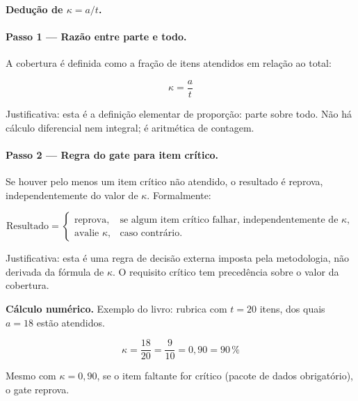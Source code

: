 \begin{metodo}
\textbf{Dedução de $\kappa = a/t$.}

\paragraph{Passo 1 — Razão entre parte e todo.}
A cobertura é definida como a fração de itens atendidos em relação ao total:

\[
\boxed{\kappa = \frac{a}{t}}
\]

Justificativa: esta é a definição elementar de proporção: parte sobre todo. Não há cálculo diferencial nem integral; é aritmética de contagem.

\paragraph{Passo 2 — Regra do gate para item crítico.}
Se houver pelo menos um item crítico não atendido, o resultado é reprova, independentemente do valor de $\kappa$. Formalmente:

\[
\text{Resultado} =
\begin{cases}
\text{reprova}, & \text{se algum item crítico falhar, independentemente de }\kappa,\\
\text{avalie }\kappa, & \text{caso contrário.}
\end{cases}
\]

Justificativa: esta é uma regra de decisão externa imposta pela metodologia, não derivada da fórmula de $\kappa$. O requisito crítico tem precedência sobre o valor da cobertura.
\end{metodo}

\begin{resultado}
\textbf{Cálculo numérico.} Exemplo do livro: rubrica com $t = 20$ itens, dos quais $a = 18$ estão atendidos.

\[
\kappa = \frac{18}{20} = \frac{9}{10} = 0{,}90 = 90\,\%
\]

Mesmo com $\kappa = 0{,}90$, se o item faltante for crítico (pacote de dados obrigatório), o gate reprova.
\end{resultado}

